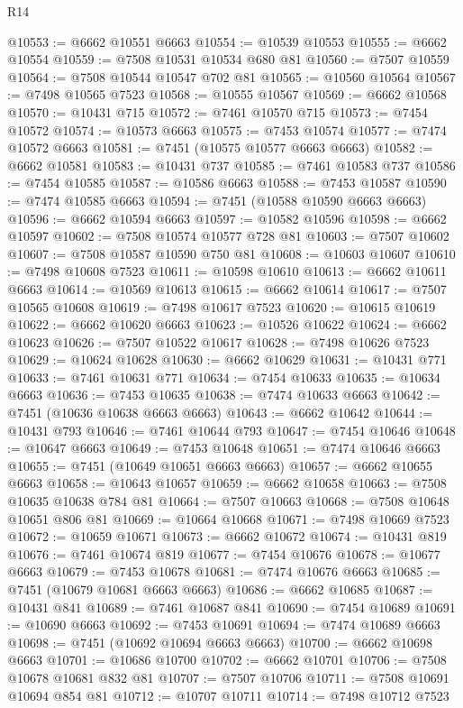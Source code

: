 \begin{lexlean}{R14}
\begin{coremodule}
@10553 := @6662 @10551 @6663
@10554 := @10539 @10553
@10555 := @6662 @10554
@10559 := @7508 @10531 @10534 @680 @81
@10560 := @7507 @10559
@10564 := @7508 @10544 @10547 @702 @81
@10565 := @10560 @10564
@10567 := @7498 @10565 @7523
@10568 := @10555 @10567
@10569 := @6662 @10568
@10570 := @10431 @715
@10572 := @7461 @10570 @715
@10573 := @7454 @10572
@10574 := @10573 @6663
@10575 := @7453 @10574
@10577 := @7474 @10572 @6663
@10581 := @7451 (@10575 @10577 @6663 @6663)
@10582 := @6662 @10581
@10583 := @10431 @737
@10585 := @7461 @10583 @737
@10586 := @7454 @10585
@10587 := @10586 @6663
@10588 := @7453 @10587
@10590 := @7474 @10585 @6663
@10594 := @7451 (@10588 @10590 @6663 @6663)
@10596 := @6662 @10594 @6663
@10597 := @10582 @10596
@10598 := @6662 @10597
@10602 := @7508 @10574 @10577 @728 @81
@10603 := @7507 @10602
@10607 := @7508 @10587 @10590 @750 @81
@10608 := @10603 @10607
@10610 := @7498 @10608 @7523
@10611 := @10598 @10610
@10613 := @6662 @10611 @6663
@10614 := @10569 @10613
@10615 := @6662 @10614
@10617 := @7507 @10565 @10608
@10619 := @7498 @10617 @7523
@10620 := @10615 @10619
@10622 := @6662 @10620 @6663
@10623 := @10526 @10622
@10624 := @6662 @10623
@10626 := @7507 @10522 @10617
@10628 := @7498 @10626 @7523
@10629 := @10624 @10628
@10630 := @6662 @10629
@10631 := @10431 @771
@10633 := @7461 @10631 @771
@10634 := @7454 @10633
@10635 := @10634 @6663
@10636 := @7453 @10635
@10638 := @7474 @10633 @6663
@10642 := @7451 (@10636 @10638 @6663 @6663)
@10643 := @6662 @10642
@10644 := @10431 @793
@10646 := @7461 @10644 @793
@10647 := @7454 @10646
@10648 := @10647 @6663
@10649 := @7453 @10648
@10651 := @7474 @10646 @6663
@10655 := @7451 (@10649 @10651 @6663 @6663)
@10657 := @6662 @10655 @6663
@10658 := @10643 @10657
@10659 := @6662 @10658
@10663 := @7508 @10635 @10638 @784 @81
@10664 := @7507 @10663
@10668 := @7508 @10648 @10651 @806 @81
@10669 := @10664 @10668
@10671 := @7498 @10669 @7523
@10672 := @10659 @10671
@10673 := @6662 @10672
@10674 := @10431 @819
@10676 := @7461 @10674 @819
@10677 := @7454 @10676
@10678 := @10677 @6663
@10679 := @7453 @10678
@10681 := @7474 @10676 @6663
@10685 := @7451 (@10679 @10681 @6663 @6663)
@10686 := @6662 @10685
@10687 := @10431 @841
@10689 := @7461 @10687 @841
@10690 := @7454 @10689
@10691 := @10690 @6663
@10692 := @7453 @10691
@10694 := @7474 @10689 @6663
@10698 := @7451 (@10692 @10694 @6663 @6663)
@10700 := @6662 @10698 @6663
@10701 := @10686 @10700
@10702 := @6662 @10701
@10706 := @7508 @10678 @10681 @832 @81
@10707 := @7507 @10706
@10711 := @7508 @10691 @10694 @854 @81
@10712 := @10707 @10711
@10714 := @7498 @10712 @7523

\end{coremodule}
\end{lexlean}
